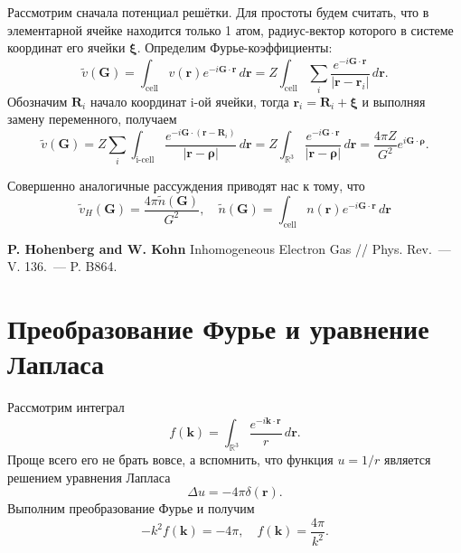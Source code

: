 \documentclass[11pt,russian]{ncc}
\renewcommand{\vec}{\boldsymbol}
\begin{document}
    Рассмотрим сначала потенциал решётки. Для простоты будем считать, что в элементарной ячейке находится только 1 атом, радиус-вектор которого в системе координат его ячейки \( \vec{\xi} \). Определим Фурье-коэффициенты:
    \begin{equation}
        \tilde{v}(\vec{G}) = \int_\text{cell} v(\vec{r}) e^{-i\vec{G}\cdot\vec{r}}\,d\vec{r} = Z \int_\text{cell} \sum_{i} \frac{e^{-i\vec{G}\cdot\vec{r}}}{|\vec{r} - \vec{r}_i|}\,d\vec{r}.
    \end{equation}
    Обозначим \(\vec{R}_i\) начало координат i-ой ячейки, тогда \( \vec{r}_i = \vec{R}_i + \vec{\xi} \) и выполняя замену переменного, получаем
    \begin{equation}
        \tilde{v}(\vec{G}) = Z \sum_{i} \int_\text{i-cell} \frac{e^{-i\vec{G}\cdot(\vec{r} - \vec{R}_i)}}{|\vec{r} - \vec{\rho}|}\,d\vec{r} =
        Z \int_{\mathbb{R}^3}\frac{e^{-i\vec{G}\cdot\vec{r}}}{|\vec{r} - \vec{\rho}|}\,d\vec{r} = \frac{4\pi Z}{G^2}e^{i\vec{G}\cdot\vec{\rho}}.
    \end{equation}

    Совершенно аналогичные рассуждения приводят нас к тому, что
    \begin{equation}
        \tilde{v}_H(\vec{G}) = \frac{4\pi\tilde{n}(\vec{G})}{G^2},\quad
        \tilde{n}(\vec{G}) = \int_\text{cell} n(\vec{r}) e^{-i\vec{G}\cdot\vec{r}}\,d\vec{r}
    \end{equation}

    \begin{thebibliography}{99}
         \textbf{P. Hohenberg and W. Kohn} Inhomogeneous Electron Gas // Phys. Rev.~--- V. 136.~--- P. B864.
    \end{thebibliography}

    \appendix
    \section{Преобразование Фурье и уравнение Лапласа}
    Рассмотрим интеграл
    \begin{equation}
        f(\vec{k}) = \int_{\mathbb{R}^3} \frac{e^{-i\vec{k}\cdot\vec{r}}}{r}\,d\vec{r}.
    \end{equation}
    Проще всего его не брать вовсе, а вспомнить, что функция \( u = 1/r \) является решением уравнения Лапласа
    \begin{equation}
        \Delta u = -4\pi\delta(\vec{r}).
    \end{equation}
    Выполним преобразование Фурье и получим
    \begin{equation}
        -k^2 f(\vec{k}) = -4\pi,\quad f(\vec{k}) = \frac{4\pi}{k^2}.
    \end{equation}
\end{document}
